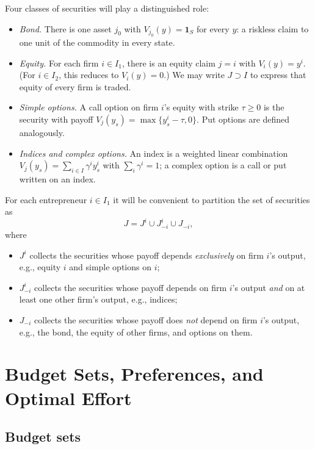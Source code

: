 \documentclass[11pt,a4paper,oneside]{book}
\def\1{\mathbf{1}}
\def\geq{\geqslant}
\theoremstyle{plain}
\theoremstyle{definition}
\theoremstyle{remark}
\numberwithin{equation}{chapter}
\begin{document}
Four classes of securities will play a distinguished role:
\begin{itemize}
  \item \emph{Bond.}
  There is one asset $j_0$ with $V_{j_0}(y) = \1_S$ for every $y$: a riskless claim to one unit of the commodity in every state.
  \item \emph{Equity.}
  For each firm $i \in I_1$, there is an equity claim $j = i$ with $V_i(y) = y^i$.
  (For $i \in I_2$, this reduces to $V_i(y) = 0$.)
  We may write $J \supset I$ to express that equity of every firm is traded.
  \item \emph{Simple options.}
  A call option on firm $i$'s equity with strike $\tau \geq 0$ is the security with payoff $V_j(y_s) = \max\{ y^i_s - \tau, 0 \}$.
  Put options are defined analogously.
  \item \emph{Indices and complex options.}
  An index is a weighted linear combination $V_j(y_s) = \sum_{i \in I} \gamma^i y^i_s$ with $\sum_i \gamma^i = 1$; a complex option is a call or put written on an index.
\end{itemize}

For each entrepreneur $i \in I_1$ it will be convenient to partition the set of securities as
\begin{equation}\label{eq:partition-J}
  J = J^i \cup J^i_{-i} \cup J_{-i},
\end{equation}
where
\begin{itemize}
  \item $J^i$ collects the securities whose payoff depends \emph{exclusively} on firm $i$'s output, e.g., equity $i$ and simple options on $i$;
  \item $J^i_{-i}$ collects the securities whose payoff depends on firm $i$'s output \emph{and} on at least one other firm's output, e.g., indices;
  \item $J_{-i}$ collects the securities whose payoff does \emph{not} depend on firm $i$'s output, e.g., the bond, the equity of other firms, and options on them.
\end{itemize}

\section{Budget Sets, Preferences, and Optimal Effort}
\label{sec:MH-budgets}

\subsection{Budget sets}
\end{document}
